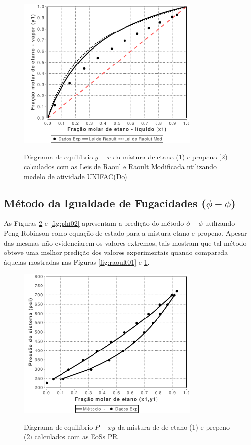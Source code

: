 \begin{figure}[htb]
\centering
{\includegraphics[width=0.8\textwidth]{img/VLE-Ethane(1)Propylene(2)-x1&y1-Raoult-RaoultMod.pdf}}
\caption{Diagrama de equilíbrio $y-x$ da mistura de etano (1) e
propeno (2) calculados com as Leis de Raoul e Raoult Modificada utilizando
modelo de atividade UNIFAC(Do)}
\label{fig:raoult02}
\end{figure} 


\subsection{Método da Igualdade de Fugacidades ($\phi-\phi$)} 

As Figuras \ref{fig:phi01} e \ref{fig:phi02} apresentam a predição do método
$\phi-\phi$ utilizando Peng-Robinson como equação de estado para a mistura
etano e propeno. Apesar das mesmas não evidenciarem os valores
extremos, tais mostram que tal método obteve uma melhor predição dos valores
experimentais quando comparada àquelas mostradas nas Figuras
\ref{fig:raoult01} e \ref{fig:raoult02}.

\begin{figure}
\centering
{\includegraphics[width=0.8\textwidth]{img/VLE-Ethane(1)Propylene(2)-x1y1&Pressure-PengRobinson.pdf}}
\caption{Diagrama de equilíbrio $P-xy$ da mistura de de etano (1) e
prepeno (2) calculados com as EoSs PR}
\label{fig:phi01}
\end{figure}

